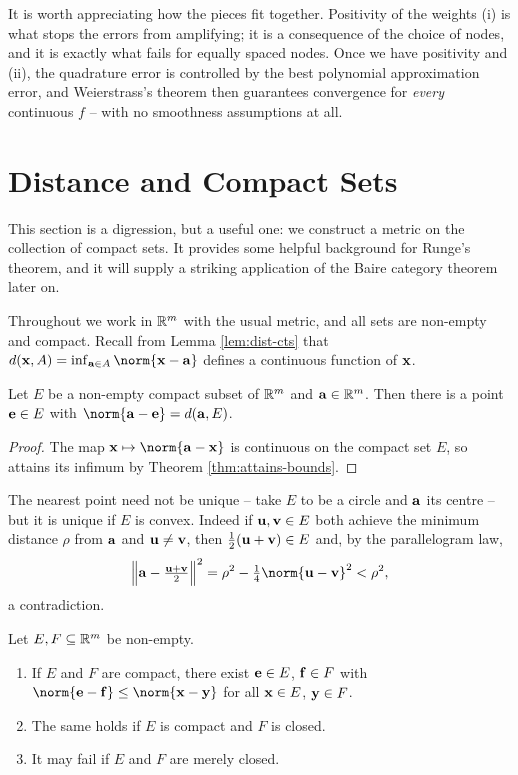 \documentclass[a4paper]{scrartcl}
\begin{document}
It is worth appreciating how the pieces fit together. Positivity of the weights (i) is what stops the errors from amplifying; it is a consequence of the choice of nodes, and it is exactly what fails for equally spaced nodes. Once we have positivity and (ii), the quadrature error is controlled by the best polynomial approximation error, and Weierstrass's theorem then guarantees convergence for \emph{every} continuous $f$ -- with no smoothness assumptions at all.

\section{Distance and Compact Sets}

This section is a digression, but a useful one: we construct a metric on the collection of compact sets. It provides some helpful background for Runge's theorem, and it will supply a striking application of the Baire category theorem later on.

Throughout we work in $\mathbb{R}^m$ with the usual metric, and all sets are non-empty and compact. Recall from Lemma \ref{lem:dist-cts} that $d(\vv{x},A) = \inf_{\vv{a}\in A}\norm{\vv{x}-\vv{a}}$ defines a continuous function of $\mathbf{x}$.

\begin{lemma}\label{lem:nearest-point}
	Let $E$ be a non-empty compact subset of $\mathbb{R}^m$ and $\mathbf{a}\in\mathbb{R}^m$. Then there is a point $\mathbf{e}\in E$ with $\norm{\vv{a}-\vv{e}} = d(\vv{a},E)$.
\end{lemma}

\begin{proof}
	The map $\vv{x}\mapsto \norm{\vv{a}-\vv{x}}$ is continuous on the compact set $E$, so attains its infimum by Theorem \ref{thm:attains-bounds}.
\end{proof}

The nearest point need not be unique -- take $E$ to be a circle and $\mathbf{a}$ its centre -- but it is unique if $E$ is convex. Indeed if $\mathbf{u},\mathbf{v}\in E$ both achieve the minimum distance $\rho$ from $\mathbf{a}$ and $\mathbf{u}\neq\mathbf{v}$, then $\tfrac12(\mathbf{u}+\mathbf{v}) \in E$ and, by the parallelogram law,
$$\Big\lVert\vv a - \tfrac{\vv u + \vv v}{2}\Big\rVert^2 = \rho^2 - \tfrac14\norm{\vv u - \vv v}^2 < \rho^2,$$
a contradiction.

\begin{lemma}\label{lem:two-sets-min}
	Let $E,F\subseteq\mathbb{R}^m$ be non-empty.
	\begin{enumerate}[label=(\roman*)]
		\item If $E$ and $F$ are compact, there exist $\mathbf{e}\in E$, $\mathbf{f}\in F$ with $\norm{\vv e-\vv f}\leq\norm{\vv x - \vv y}$ for all $\mathbf{x}\in E$, $\mathbf{y}\in F$.
		\item The same holds if $E$ is compact and $F$ is closed.
		\item It may fail if $E$ and $F$ are merely closed.
	\end{enumerate}
\end{lemma}
\end{document}
